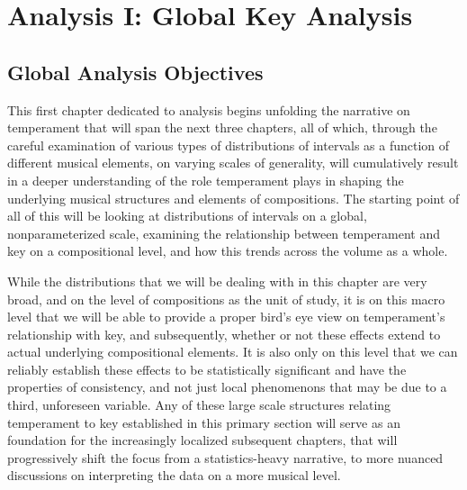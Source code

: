     
    
    

    \hypertarget{Analysis I: Global Key Analysis}{\chapter{Analysis I: Global Key Analysis}\label{Analysis I: Global Key Analysis}}


    \section{Global Analysis Objectives}\label{global-analysis-objectives}

    This first chapter dedicated to analysis begins unfolding the narrative
on temperament that will span the next three chapters, all of which,
through the careful examination of various types of distributions of
intervals as a function of different musical elements, on varying scales
of generality, will cumulatively result in a deeper understanding of the
role temperament plays in shaping the underlying musical structures and
elements of compositions. The starting point of all of this will be
looking at distributions of intervals on a global, nonparameterized
scale, examining the relationship between temperament and key on a
compositional level, and how this trends across the volume as a whole.

While the distributions that we will be dealing with in this chapter are
very broad, and on the level of compositions as the unit of study, it is
on this macro level that we will be able to provide a proper bird's eye
view on temperament's relationship with key, and subsequently, whether
or not these effects extend to actual underlying compositional elements.
It is also only on this level that we can reliably establish these
effects to be statistically significant and have the properties of
consistency, and not just local phenomenons that may be due to a third,
unforeseen variable. Any of these large scale structures relating
temperament to key established in this primary section will serve as an
foundation for the increasingly localized subsequent chapters, that will
progressively shift the focus from a statistics-heavy narrative, to more
nuanced discussions on interpreting the data on a more musical level.

